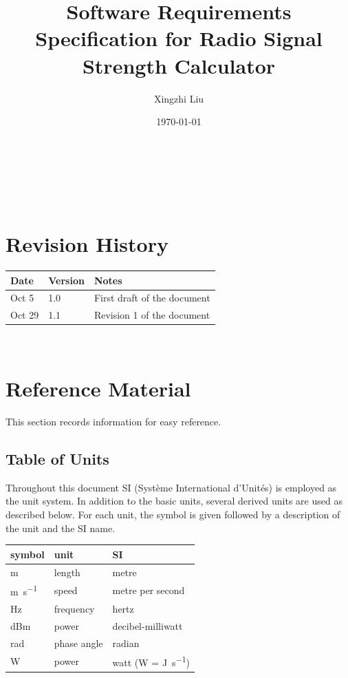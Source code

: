 \documentclass[12pt]{article}
\begin{document}
\title{Software Requirements Specification for Radio Signal Strength Calculator} 
\author{Xingzhi Liu}
\date{\today}
	
\maketitle

~\newpage


\tableofcontents

~\newpage

\section*{Revision History}

\begin{tabularx}{\textwidth}{p{3cm}p{2cm}X}
\toprule {\bf Date} & {\bf Version} & {\bf Notes}\\
\midrule
Oct 5 & 1.0 & First draft of the document\\
Oct 29 & 1.1 & Revision 1 of the document\\
\bottomrule
\end{tabularx}

~\newpage

\section{Reference Material}

This section records information for easy reference.

\subsection{Table of Units}

Throughout this document SI (Syst\`{e}me International d'Unit\'{e}s) is employed
as the unit system.  In addition to the basic units, several derived units are
used as described below.  For each unit, the symbol is given followed by a
description of the unit and the SI name.
~\newline

\renewcommand{\arraystretch}{1.2}
  \noindent \begin{tabular}{l l l} 
    \toprule		
    \textbf{symbol} & \textbf{unit} & \textbf{SI}\\
    \midrule 
    \si{\metre} & length & metre\\
    \si{\metre\per\second} & speed & metre per second\\
    \si{\hertz} & frequency	& hertz\\
    \si{dBm} & power & decibel-milliwatt\\
    \si{\radian} & phase angle & radian\\
    \si{\watt} & power & watt (W = \si{\joule\per\second})\\
    \bottomrule
  \end{tabular}
\end{document}
